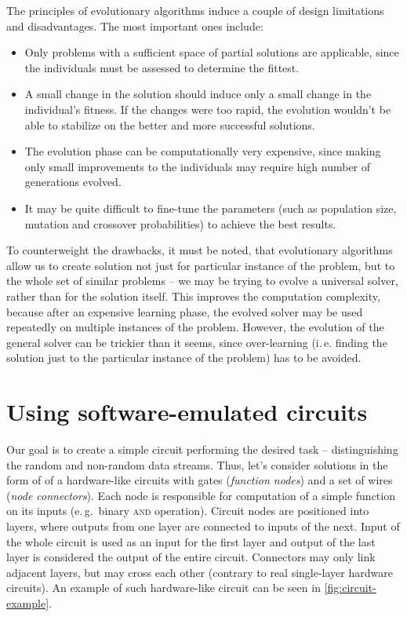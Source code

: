 \documentclass[12pt,oneside]{fithesis2}		%
\renewcommand{\_}{\leavevmode \kern0.0em\vbox{\hrule width0.4em}}
\newcommand{\squarebullet}{\textcolor{black}{\raisebox{0.15em}{\rule{4pt}{4pt}}}}
\newenvironment{myItemize}{
  \begin{itemize}[leftmargin=2em,rightmargin=1em,itemsep=\parskip ,parsep=0em,topsep=0em,partopsep=0em]
  \renewcommand{\labelitemi}{\squarebullet}
  \renewcommand{\labelitemii}{$\diamond$}
}{
  \end{itemize}
}
\begin{document}
\noindent
The principles of evolutionary algorithms induce a couple of design limitations and disadvantages. 
The most important ones include:
\begin{myItemize}
\item Only problems with a sufficient space of partial solutions are applicable, since the individuals must be assessed 
to determine the fittest.
\item A small change in the solution should induce only a small change in the individual's fitness. If the changes were
too rapid, the evolution wouldn't be able to stabilize on the better and more successful solutions.
\item The evolution phase can be computationally very expensive, since making only small improvements to the individuals may require
high number of generations evolved.
\item It may be quite difficult to fine-tune the parameters (such as population size, mutation and crossover probabilities)
to achieve the best results.
\end{myItemize}

\noindent
To counterweight the drawbacks, it must be noted, that evolutionary algorithms allow us to create solution not just for particular
instance of the problem, but to the whole set of similar problems -- we may be trying to evolve a universal solver, 
rather than for the solution itself. 
This improves the computation complexity, because after an expensive learning phase, the evolved solver may be used
repeatedly on multiple instances of the problem. However, the evolution of the general solver can be trickier than it seems,
since over-learning (i.\,e. finding the solution just to the particular instance of the problem) has to be avoided.

\section{Using software-emulated circuits}
\label{sec:sw-circuits}

Our goal is to create a simple circuit performing the desired task -- distinguishing the random and non-random data streams.
Thus, let's consider solutions in the form of of a hardware-like circuits with gates (\textit{function nodes}) 
and a set of wires (\textit{node connectors}).
Each node is responsible for computation of a simple function on its inputs (e.\,g.\ binary \textsc{and} operation).
Circuit nodes are positioned into layers, where outputs from one layer are connected to inputs of the next. Input of the whole
circuit is used as an input for the first layer and output of the last layer is considered the output of the entire circuit.
Connectors may only link adjacent layers, but may cross each other (contrary to real single-layer hardware circuits).
An example of such hardware-like circuit can be seen in \autoref{fig:circuit-example}.
\end{document}
